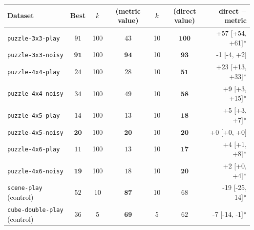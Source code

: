 \begin{tabular}{lccccc r}
\toprule
Dataset & Best & $k$ & \wmpp{} (metric value) & $k$ & \wmpp{} (direct value) & direct $-$ metric \\
\midrule
\texttt{puzzle-3x3-play} & $91$ & 100 & $43$ & 10 & $\mathbf{100}$ & +57 [+54, +61]* \\
\texttt{puzzle-3x3-noisy} & $\mathbf{91}$ & 100 & $\mathbf{94}$ & 10 & $\mathbf{93}$ & -1 [-4, +2] \\
\texttt{puzzle-4x4-play} & $24$ & 100 & $28$ & 10 & $\mathbf{51}$ & +23 [+13, +33]* \\
\texttt{puzzle-4x4-noisy} & $34$ & 100 & $49$ & 10 & $\mathbf{58}$ & +9 [+3, +15]* \\
\texttt{puzzle-4x5-play} & $14$ & 100 & $13$ & 10 & $\mathbf{18}$ & +5 [+3, +7]* \\
\texttt{puzzle-4x5-noisy} & $\mathbf{20}$ & 100 & $\mathbf{20}$ & 10 & $\mathbf{20}$ & +0 [+0, +0] \\
\texttt{puzzle-4x6-play} & $11$ & 100 & $13$ & 10 & $\mathbf{17}$ & +4 [+1, +8]* \\
\texttt{puzzle-4x6-noisy} & $\mathbf{19}$ & 100 & $18$ & 10 & $\mathbf{20}$ & +2 [+0, +4]* \\
\texttt{scene-play} (control) & $52$ & 10 & $\mathbf{87}$ & 10 & $68$ & -19 [-25, -14]* \\
\texttt{cube-double-play} (control) & $36$ & 5 & $\mathbf{69}$ & 5 & $62$ & -7 [-14, -1]* \\
\bottomrule
\end{tabular}
